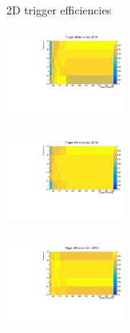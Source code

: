 \documentclass[8pt]{beamer}
\begin{document}
\begin{frame}{2D trigger efficiencies}
\justifying
\begin{minipage}[b]{.32\textwidth}
\begin{center}
\includegraphics[width=3.9cm, height=3cm]{figs/triggEff_2016_ee.pdf}
\end{center}
\end{minipage} \hfill
\begin{minipage}[b]{.32\textwidth}
\begin{center}
\includegraphics[width=3.9cm, height=3cm]{figs/triggEff_2016_em.pdf}
\end{center}
\end{minipage} \hfill
\begin{minipage}[b]{.32\textwidth}
\begin{center}
\includegraphics[width=3.9cm, height=3cm]{figs/triggEff_2016_mm.pdf}
\end{center}
\end{minipage} \vfill


\end{frame}
\end{document}
